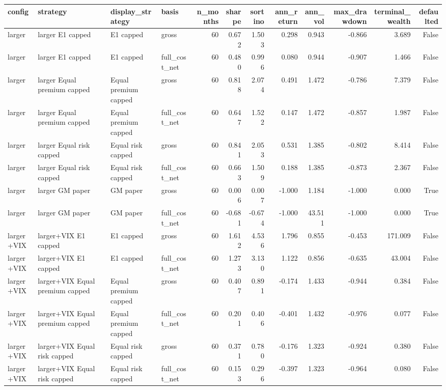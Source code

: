 \begin{tabular}{llllrrrrrrrr}
\toprule
config & strategy & display\_strategy & basis & n\_months & sharpe & sortino & ann\_return & ann\_vol & max\_drawdown & terminal\_wealth & defaulted \\
\midrule
larger & larger E1 capped & E1 capped & gross & 60 & 0.672 & 1.503 & 0.298 & 0.943 & -0.866 & 3.689 & False \\
larger & larger E1 capped & E1 capped & full\_cost\_net & 60 & 0.480 & 0.996 & 0.080 & 0.944 & -0.907 & 1.466 & False \\
larger & larger Equal premium capped & Equal premium capped & gross & 60 & 0.818 & 2.074 & 0.491 & 1.472 & -0.786 & 7.379 & False \\
larger & larger Equal premium capped & Equal premium capped & full\_cost\_net & 60 & 0.647 & 1.522 & 0.147 & 1.472 & -0.857 & 1.987 & False \\
larger & larger Equal risk capped & Equal risk capped & gross & 60 & 0.841 & 2.053 & 0.531 & 1.385 & -0.802 & 8.414 & False \\
larger & larger Equal risk capped & Equal risk capped & full\_cost\_net & 60 & 0.663 & 1.509 & 0.188 & 1.385 & -0.873 & 2.367 & False \\
larger & larger GM paper & GM paper & gross & 60 & 0.006 & 0.007 & -1.000 & 1.184 & -1.000 & 0.000 & True \\
larger & larger GM paper & GM paper & full\_cost\_net & 60 & -0.681 & -0.674 & -1.000 & 43.511 & -1.000 & 0.000 & True \\
larger+VIX & larger+VIX E1 capped & E1 capped & gross & 60 & 1.612 & 4.536 & 1.796 & 0.855 & -0.453 & 171.009 & False \\
larger+VIX & larger+VIX E1 capped & E1 capped & full\_cost\_net & 60 & 1.273 & 3.130 & 1.122 & 0.856 & -0.635 & 43.004 & False \\
larger+VIX & larger+VIX Equal premium capped & Equal premium capped & gross & 60 & 0.407 & 0.891 & -0.174 & 1.433 & -0.944 & 0.384 & False \\
larger+VIX & larger+VIX Equal premium capped & Equal premium capped & full\_cost\_net & 60 & 0.201 & 0.406 & -0.401 & 1.432 & -0.976 & 0.077 & False \\
larger+VIX & larger+VIX Equal risk capped & Equal risk capped & gross & 60 & 0.371 & 0.780 & -0.176 & 1.323 & -0.924 & 0.380 & False \\
larger+VIX & larger+VIX Equal risk capped & Equal risk capped & full\_cost\_net & 60 & 0.153 & 0.296 & -0.397 & 1.323 & -0.964 & 0.080 & False \\

\end{tabular}
